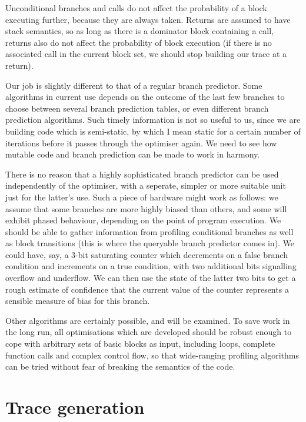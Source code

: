 Unconditional branches and calls do not affect the probability of a block executing further, because they are always taken. Returns are assumed to have stack semantics, so as long as there is a dominator block containing a call, returns also do not affect the probability of block execution (if there is no associated call in the current block set, we should stop building our trace at a return).

Our job is slightly different to that of a regular branch predictor. Some algorithms in current use depends on the outcome of the last few branches to choose between several branch prediction tables, or even different branch prediction algorithms. Such timely information is not so useful to us, since we are building code which is semi-static, by which I mean static for a certain number of iterations before it passes through the optimiser again. We need to see how mutable code and branch prediction can be made to work in harmony.

There is no reason that a highly sophisticated branch predictor can be used independently of the optimiser, with a seperate, simpler or more suitable unit just for the latter's use. Such a piece of hardware might work as follows: we assume that some branches are more highly biased than others, and some will exhibit phased behaviour, depending on the point of program execution. We should be able to gather information from profiling conditional branches as well as block transitions (this is where the queryable branch predictor comes in). We could have, say, a 3-bit saturating counter which decrements on a false branch condition and increments on a true condition, with two additional bits signalling overflow and underflow. We can then use the state of the latter two bits to get a rough estimate of confidence that the current value of the counter represents a sensible measure of bias for this branch.

Other algorithms are certainly possible, and will be examined. To save work in the long run, all optimisations which are developed should be robust enough to cope with arbitrary sets of basic blocks as input, including loops, complete function calls and complex control flow, so that wide-ranging profiling algorithms can be tried without fear of breaking the semantics of the code.

\section{Trace generation}

